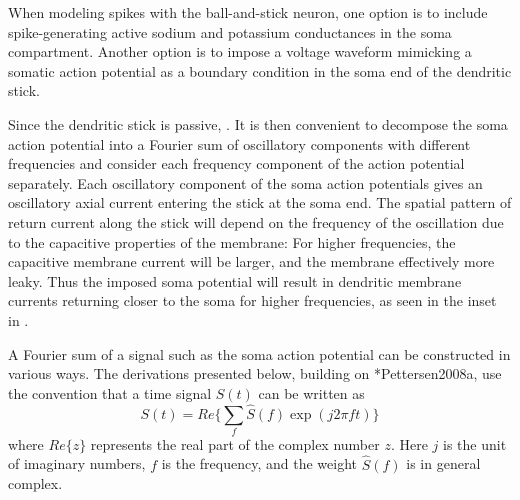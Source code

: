 When modeling spikes with the ball-and-stick neuron, one option is to include spike-generating active sodium and potassium conductances in the soma compartment. Another option is to impose a voltage waveform mimicking a somatic action potential as a boundary condition in the soma end of the dendritic stick. 

Since the dendritic stick is passive,  . It is then convenient to decompose the soma action potential into a Fourier sum of oscillatory components with different frequencies and consider each frequency component of the action potential separately. Each oscillatory component of the soma action potentials gives an oscillatory axial current entering the stick at the soma end. The spatial pattern of return current along the stick will depend on the frequency of the oscillation due to the capacitive properties of the membrane: For higher frequencies, the capacitive membrane current will be larger, and the  membrane effectively more leaky. Thus the imposed soma potential will result in dendritic membrane currents returning closer to the soma for higher frequencies,  as seen in the inset in . 


A Fourier sum of a signal such as the soma action potential can be constructed in various ways. The derivations presented below, building on \citeasnoun**{Pettersen2008a}, use the convention that a time signal $S(t)$ can be written as
\begin{equation}
S(t) = Re \{ \sum_{f}  \hat{S}(f) \exp (j 2 \pi f t) \}
\label{eq:Spikes:Fourier_sum}
\end{equation}
where $Re\{z\}$ represents the real part of the complex number $z$.  Here $j$ is the unit of imaginary numbers, $f$ is the frequency, and the weight $\hat{S}(f)$ is in general complex. 

